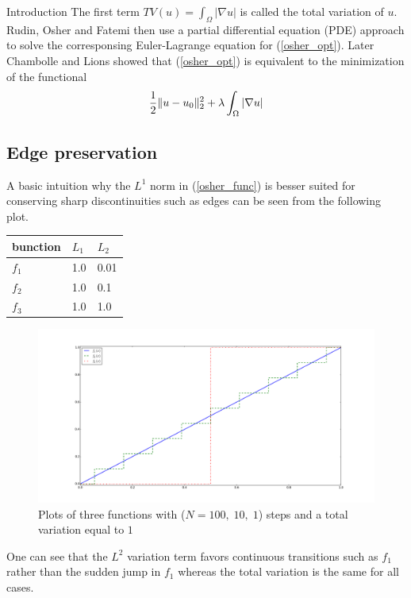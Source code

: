 \begin{chapter}{Introduction}
The first term $TV(u)=\int_\Omega\left\vert\nabla u\right\vert$ is called the total variation of $u$. Rudin, Osher and Fatemi then use a partial differential equation (PDE) approach to solve
the corresponsing Euler-Lagrange equation for (\ref{osher_opt}). Later Chambolle and Lions \cite{ChambolleLions} showed that (\ref{osher_opt}) is equivalent to the minimization of
the functional
\begin{equation}
    \label{osher_func}
    \frac{1}{2}\| u-u_0 \|_2^2 +\lambda \int_\Omega\left\vert\nabla u\right\vert
\end{equation}

\subsection{Edge preservation} %
\label{sub:Edge preservation}
A basic intuition why the $L^1$ norm in (\ref{osher_func}) is besser suited for conserving sharp discontinuities such as edges can be seen from the following plot.
	    \begin{tabular}{|l|l|l|}
		\hline
	    	bunction & $L_1$ & $L_2$ \\
		\hline
		$f_1$ & 1.0 & 0.01 \\
		$f_2$ & 1.0 & 0.1 \\
		$f_3$ & 1.0 & 1.0
		\hline
	    \end{tabular}
\begin{figure}[h!]
        \centering
	    \includegraphics[width=1.0\linewidth]{./figures/introduction/tv12comparison.pdf}
	\caption[]{Plots of three functions with ($N=100,\;10,\;1$) steps and a total variation equal to $1$}
	\label{fig:tv12comparison}
\end{figure}


One can see that the $L^2$ variation term favors continuous transitions such as $f_1$ rather than the sudden jump in $f_1$ whereas the total variation is the same for
all cases.


\end{chapter}
